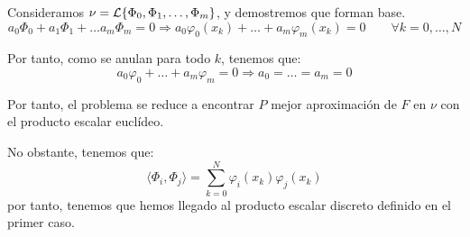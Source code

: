 Consideramos $\nu = \mathcal{L}\{\Phi_0, \Phi_1, \dots, \Phi_m\}$, y demostremos que forman base.
\begin{equation*}
    a_0 \Phi_0 + a_1\Phi_1 + \dots a_m\Phi_m = 0 \Longrightarrow
    a_0\varphi_0(x_k) + \dots + a_m\varphi_m(x_k)=0 \qquad \forall k=0,\dots,N
\end{equation*}

Por tanto, como se anulan para todo $k$, tenemos que:
\begin{equation*}
    a_0\varphi_0 + \dots + a_m\varphi_m = 0 \Longrightarrow a_0=\dots=a_m=0
\end{equation*}

Por tanto, el problema se reduce a encontrar $P$ mejor aproximación de $F$ en $\nu$ con el producto escalar euclídeo.

No obstante, tenemos que:
\begin{equation*}
    \langle \Phi_i, \Phi_j\rangle = \sum_{k=0}^N \varphi_i(x_k)\varphi_j(x_k)
\end{equation*}
por tanto, tenemos que hemos llegado al producto escalar discreto definido en el primer caso.


